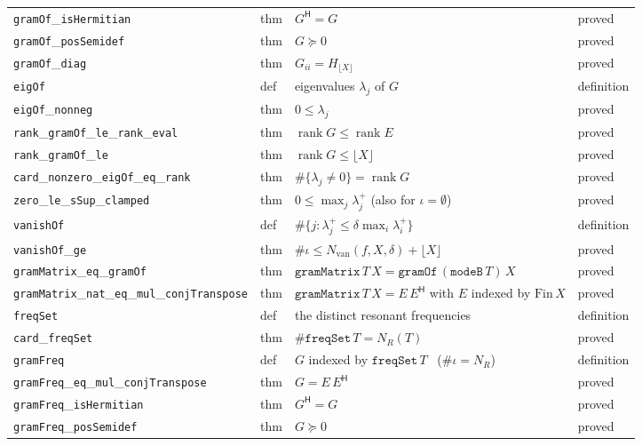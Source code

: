 \documentclass[11pt,a4paper]{article}
\newcommand{\lb}{\_\allowbreak}
\theoremstyle{definition}
\theoremstyle{remark}
\begin{document}
\begin{longtable}{@{}p{3.75cm}p{1.52cm}p{8.38cm}p{1.45cm}@{}}
\texttt{gramOf}\lb\texttt{isHermitian} & thm & $G^{\mathsf H}=G$ & proved\\
\texttt{gramOf}\lb\texttt{posSemidef} & thm & $G\succeq0$ & proved\\
\texttt{gramOf}\lb\texttt{diag} & thm & $G_{ii}=H_{\lfloor X\rfloor}$ & proved\\
\texttt{eigOf} & def & eigenvalues $\lambda_j$ of $G$ & definition\\
\texttt{eigOf}\lb\texttt{nonneg} & thm & $0\le\lambda_j$ & proved\\
\texttt{rank}\lb\texttt{gramOf}\lb\texttt{le}\lb\texttt{rank}\lb\texttt{eval} & thm & $\operatorname{rank}G\le\operatorname{rank}E$ & proved\\
\texttt{rank}\lb\texttt{gramOf}\lb\texttt{le} & thm & $\operatorname{rank}G\le\lfloor X\rfloor$ & proved\\
\texttt{card}\lb\texttt{nonzero}\lb\texttt{eigOf}\lb\texttt{eq}\lb\texttt{rank} & thm & $\#\{\lambda_j\ne0\}=\operatorname{rank}G$ & proved\\
\texttt{zero}\lb\texttt{le}\lb\texttt{sSup}\lb\texttt{clamped} & thm & $0\le\max_j\lambda_j^{+}$ (also for $\iota=\emptyset$) & proved\\
\texttt{vanishOf} & def & $\#\{j:\lambda_j^{+}\le\delta\max_i\lambda_i^{+}\}$ & definition\\
\texttt{vanishOf}\lb\texttt{ge} & thm & $\#\iota\le N_{\mathrm{van}}(f,X,\delta)+\lfloor X\rfloor$ & proved\\
\texttt{gramMatrix}\lb\texttt{eq}\lb\texttt{gramOf} & thm & $\texttt{gramMatrix}\,T\,X=\texttt{gramOf}\,(\texttt{modeB}\,T)\,X$ & proved\\
\texttt{gramMatrix}\lb\texttt{nat}\lb\texttt{eq}\lb\texttt{mul}\lb\texttt{conjTranspose} & thm & $\texttt{gramMatrix}\,T\,X=E\,E^{\mathsf H}$ with $E$ indexed by $\mathrm{Fin}\,X$ & proved\\
\texttt{freqSet} & def & the distinct resonant frequencies & definition\\
\texttt{card}\lb\texttt{freqSet} & thm & $\#\texttt{freqSet}\,T=N_R(T)$ & proved\\
\texttt{gramFreq} & def & $G$ indexed by $\texttt{freqSet}\,T$ \ ($\#\iota=N_R$) & definition\\
\texttt{gramFreq}\lb\texttt{eq}\lb\texttt{mul}\lb\texttt{conjTranspose} & thm & $G=E\,E^{\mathsf H}$ & proved\\
\texttt{gramFreq}\lb\texttt{isHermitian} & thm & $G^{\mathsf H}=G$ & proved\\
\texttt{gramFreq}\lb\texttt{posSemidef} & thm & $G\succeq0$ & proved\\

\end{longtable}
\end{document}

